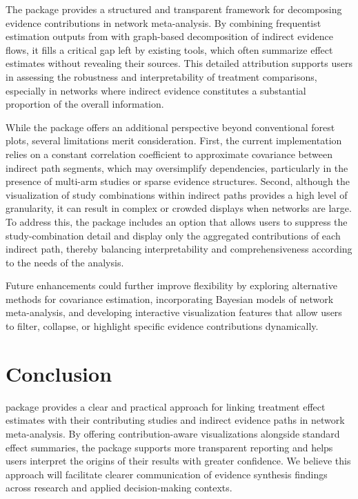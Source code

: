 The  package provides a structured and transparent framework for decomposing evidence contributions in network meta-analysis. By combining frequentist estimation outputs from  with graph-based decomposition of indirect evidence flows, it fills a critical gap left by existing tools, which often summarize effect estimates without revealing their sources. This detailed attribution supports users in assessing the robustness and interpretability of treatment comparisons, especially in networks where indirect evidence constitutes a substantial proportion of the overall information.

While the package offers an additional perspective beyond conventional forest plots, several limitations merit consideration. First, the current implementation relies on a constant correlation coefficient to approximate covariance between indirect path segments, which may oversimplify dependencies, particularly in the presence of multi-arm studies or sparse evidence structures. Second, although the visualization of study combinations within indirect paths provides a high level of granularity, it can result in complex or crowded displays when networks are large. To address this, the package includes an option that allows users to suppress the study-combination detail and display only the aggregated contributions of each indirect path, thereby balancing interpretability and comprehensiveness according to the needs of the analysis.

Future enhancements could further improve flexibility by exploring alternative methods for covariance estimation, incorporating Bayesian models of network meta-analysis, and developing interactive visualization features that allow users to filter, collapse, or highlight specific evidence contributions dynamically.

\section{Conclusion}

 package provides a clear and practical approach for linking treatment effect estimates with their contributing studies and indirect evidence paths in network meta-analysis. By offering contribution-aware visualizations alongside standard effect summaries, the package supports more transparent reporting and helps users interpret the origins of their results with greater confidence. We believe this approach will facilitate clearer communication of evidence synthesis findings across research and applied decision-making contexts.

